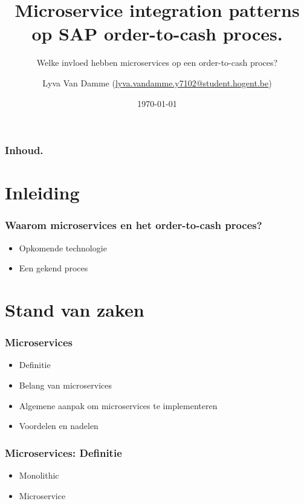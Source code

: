 \documentclass[aspectratio=169]{beamer}
\title[Korte titel]{Microservice integration patterns op SAP order-to-cash proces.}
\subtitle{Welke invloed hebben microservices op een order-to-cash proces?}
\author{Lyva Van Damme (\href{mailto:lyva.vandamme.y7102@student.hogent.be}{lyva.vandamme.y7102@student.hogent.be})}
\date{\today}
\begin{document}

\frame{\maketitle}

\begin{frame}
  \frametitle{Inhoud.}

  \tableofcontents
\end{frame}
 

\section{Inleiding}

\begin{frame}
  \frametitle{Waarom microservices en het order-to-cash proces?}
  
  \begin{itemize}
	  \item Opkomende technologie
	  \item Een gekend proces
	\end{itemize}
\end{frame}


\section{Stand van zaken}

\begin{frame}
	\frametitle{Microservices}
	\begin{itemize}
		\item Definitie
		\item Belang van microservices
		\item Algemene aanpak om microservices te implementeren
		\item Voordelen en nadelen
	\end{itemize}

\end{frame}

\begin{frame}
	\frametitle{Microservices: Definitie}
	\begin{itemize}
		\item Monolithic
		\item Microservice
	\end{itemize}

\end{frame}
\end{document}
